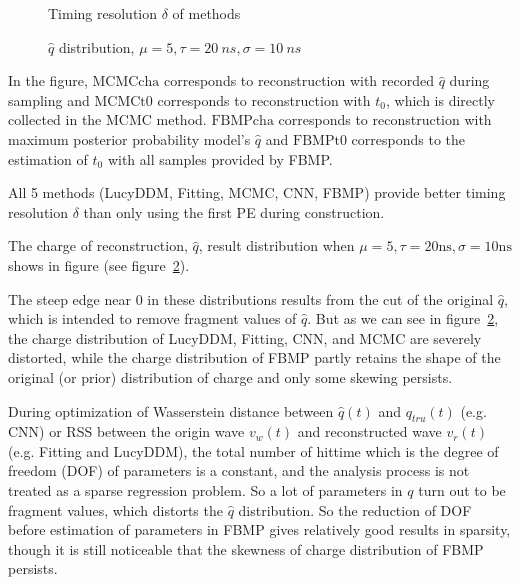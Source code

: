 \begin{figure}[H]
    \centering
    \resizebox{\textwidth}{!}{}
    \caption{\label{fig:deltamethods} Timing resolution $\delta$ of methods}
\end{figure}

\begin{figure}[H]
    \centering
    \resizebox{\textwidth}{!}{}
    \caption{\label{fig:recchargehist}  $\hat{q}$ distribution, $\mu=5, \tau=\SI{20}{ns}, \sigma=\SI{10}{ns}$}
\end{figure}

In the figure, $\mathrm{MCMCcha}$ corresponds to reconstruction with recorded $\hat{q}$ during sampling and $\mathrm{MCMCt0}$ corresponds to reconstruction with $t_{0}$, which is directly collected in the MCMC method. $\mathrm{FBMPcha}$ corresponds to reconstruction with maximum posterior probability model's $\hat{q}$ and $\mathrm{FBMPt0}$ corresponds to the estimation of $t_{0}$ with all samples provided by FBMP. 

All 5 methods (LucyDDM, Fitting, MCMC, CNN, FBMP) provide better timing resolution $\delta$ than only using the first PE during construction. 


The charge of reconstruction, $\hat{q}$, result distribution when $\mu=5, \tau=20\mathrm{ns}, \sigma=10\mathrm{ns}$ shows in figure (see figure~\ref{fig:recchargehist}). 

The steep edge near 0 in these distributions results from the cut of the original $\hat{q}$, which is intended to remove fragment values of $\hat{q}$. But as we can see in figure~\ref{fig:recchargehist}, the charge distribution of LucyDDM, Fitting, CNN, and MCMC are severely distorted, while the charge distribution of FBMP partly retains the shape of the original (or prior) distribution of charge and only some skewing persists. 

During optimization of Wasserstein distance between $\hat{q}(t)$ and $q_{tru}(t)$ (e.g. CNN) or RSS between the origin wave $v_{w}(t)$ and reconstructed wave $v_{r}(t)$ (e.g. Fitting and LucyDDM), the total number of hittime which is the degree of freedom (DOF) of parameters is a constant, and the analysis process is not treated as a sparse regression problem. So a lot of parameters in $q$ turn out to be fragment values, which distorts the $\hat{q}$ distribution. So the reduction of DOF before estimation of parameters in FBMP gives relatively good results in sparsity, though it is still noticeable that the skewness of charge distribution of FBMP persists. 

